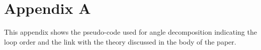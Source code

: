\appendix
\section{Appendix A}

This appendix shows the pseudo-code used for angle decomposition
indicating the loop order and the link with the theory discussed
in the body of the paper.

